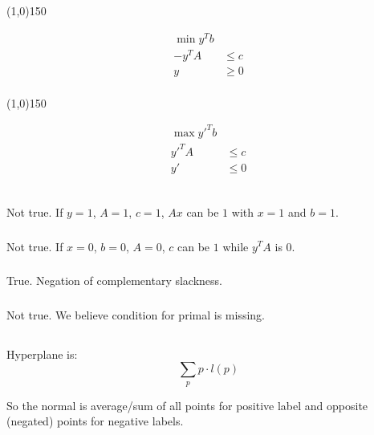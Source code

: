 \documentclass[a4paper,11pt,oneside,onecolumn]{article}
\def\zline{
    \vspace{-2.9em}
    \begin{center}\centering\line(1,0){150}\end{center}
    \vspace{-2.9em}
}
\begin{document}
\zline

\begin{align*}
\min y^Tb & \\
-y^TA & \le c \\
y & \ge 0 \\
\end{align*}

\zline

\begin{align*}
\max y'^Tb & \\
y'^TA & \le c \\
y' & \le 0 \\
\end{align*}

\subsection{}

\subsubsection{}

Not true. If $y = 1$, $A = 1$, $c = 1$, $Ax$ can be $1$ with $x = 1$ and $b = 1$.

\subsubsection{}

Not true. If $x = 0$, $b = 0$, $A = 0$, $c$ can be $1$ while $y^TA$ is $0$.

\subsubsection{}

True. Negation of complementary slackness.

\subsubsection{}

Not true. We believe condition for primal is missing.

\subsection{}

Hyperplane is:
$$
\sum_p p \cdot l(p)
$$

So the normal is average/sum of all points for positive label and opposite (negated) points for negative labels.
\end{document}
